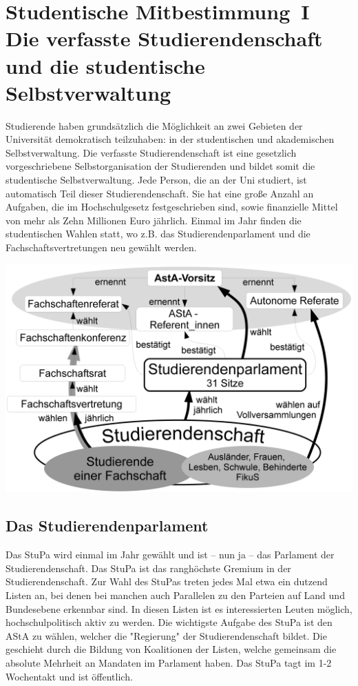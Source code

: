\section[Studentische Mitbestimmung]{Studentische Mitbestimmung~I\\Die verfasste Studierendenschaft und die studentische Selbstverwaltung}
\label{studmit}
\begin{multicols*}{2}
Studierende haben grundsätzlich die Möglichkeit an zwei Gebieten der Universität demokratisch teilzuhaben: in der studentischen und akademischen Selbstverwaltung.
Die verfasste Studierendenschaft ist eine gesetzlich vorgeschriebene Selbstorganisation der Studierenden und bildet somit die studentische Selbstverwaltung. Jede Person, die an der Uni studiert, ist automatisch Teil dieser Studierendenschaft. Sie hat eine große Anzahl an Aufgaben, die im Hochschulgesetz festgeschrieben sind, sowie finanzielle Mittel von mehr als Zehn Millionen Euro jährlich. 
Einmal im Jahr finden die studentischen Wahlen statt, wo z.B. das Studierendenparlament und die Fachschaftsvertretungen neu gewählt werden. 



\bigskip
\includegraphics[width=\columnwidth]{res/verfasste_studierendenschaft.png}
\bigskip


\subsection{Das Studierendenparlament}
Das StuPa wird einmal im Jahr gewählt und ist -- nun ja -- das Parlament der Studierendenschaft. Das StuPa ist das ranghöchste Gremium in der Studierendenschaft. Zur Wahl des StuPas treten jedes Mal etwa ein dutzend Listen an, bei denen bei manchen auch Parallelen zu den Parteien auf Land und Bundesebene erkennbar sind. In diesen Listen ist es interessierten Leuten möglich, hochschulpolitisch aktiv zu werden. 
Die wichtigste Aufgabe des StuPa ist den AStA zu wählen, welcher die "Regierung" der Studierendenschaft bildet. Die geschieht durch die Bildung von Koalitionen der Listen, welche gemeinsam die absolute Mehrheit an Mandaten im Parlament haben. Das StuPa tagt im 1-2 Wochentakt und ist öffentlich. 



\end{multicols*}
